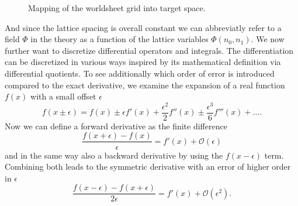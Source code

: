 \begin{figure}[!ht]
	\centering
{}
\caption{Mapping of the worldsheet grid into target space.}
\end{figure}
%
%
%
And since the lattice spacing is overall constant we can abbreviatly refer to a field $\mathit{\Phi}$ in the theory as a function of the lattice variables $\mathit{\Phi}(n_{0},n_{1})$. We now further want to discretize differential operators and integrals. The differentiation can be discretized in various ways inspired by its mathematical definition via differential quotients. To see additionally which order of error is introduced compared to the exact derivative, we examine the  expansion of a real function $f(x)$ with a small offset $\epsilon$
\begin{equation}
f(x\pm \epsilon) = f(x) \pm \epsilon f'(x) +\dfrac{\epsilon^{2}}{2}f''(x) \pm \dfrac{\epsilon^{3}}{6}f'''(x) + \ldots.
\end{equation}
Now we can define a forward derivative as the finite difference
\begin{equation}
\dfrac{f(x+\epsilon)-f(x)}{\epsilon} = f'(x) + \mathcal{O}(\epsilon)
\end{equation}
and in the same way also a backward derivative by using the $f(x-\epsilon)$ term. Combining both leads to the symmetric derivative with an error of higher order in $\epsilon$
\begin{equation}
\dfrac{f(x-\epsilon)-f(x+\epsilon)}{2 \epsilon} = f'(x) + \mathcal{O}(\epsilon^{2}).
\end{equation}
